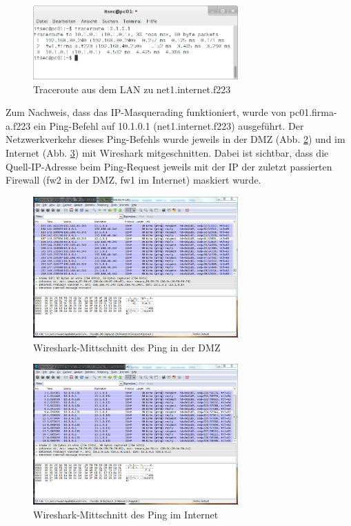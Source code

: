 \begin{figure}[h!]
	\centering
		\includegraphics[width=0.7\textwidth]{figures/pc01_traceroute_net1.png}
	\caption{Traceroute aus dem LAN zu net1.internet.f223}
	\label{fig:pc01_traceroute_net1}
\end{figure}

Zum Nachweis, dass das IP-Masquerading funktioniert, wurde von pc01.firma-a.f223 ein Ping-Befehl auf 10.1.0.1 (net1.internet.f223) ausgeführt. Der Netzwerkverkehr dieses Ping-Befehls wurde jeweils in der DMZ (Abb. \ref{fig:ws_dmz}) und im Internet (Abb. \ref{fig:ws_internet}) mit Wireshark mitgeschnitten. Dabei ist sichtbar, dass die Quell-IP-Adresse beim Ping-Request jeweils mit der IP der zuletzt passierten Firewall (fw2 in der DMZ, fw1 im Internet) maskiert wurde.

\begin{figure}[h!]
	\centering
		\includegraphics[width=0.7\textwidth]{figures/ws_dmz.png}
	\caption{Wireshark-Mittschnitt des Ping in der DMZ}
	\label{fig:ws_dmz}
\end{figure}

\begin{figure}[h!]
	\centering
		\includegraphics[width=0.7\textwidth]{figures/ws_internet.png}
	\caption{Wireshark-Mittschnitt des Ping im Internet}
	\label{fig:ws_internet}
\end{figure}


